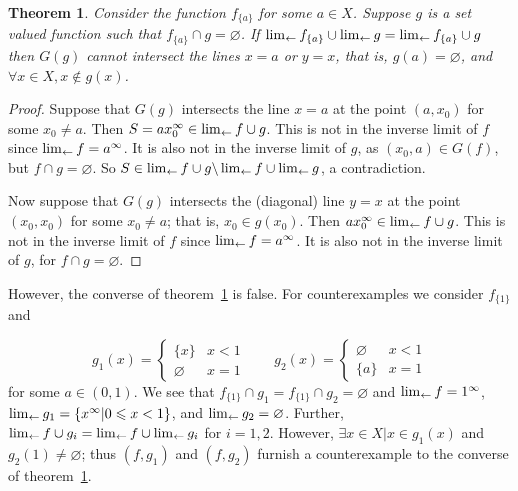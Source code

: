 \documentclass{article}
\newtheorem{thm}{Theorem}
\theoremstyle{definition}
\let\emptyset\varnothing
\begin{document}
\newcommand{\fa}{f_{\lbrace a\rbrace}}

\begin{thm}\label{fish}
Consider the function $\fa$ for some $a\in X$.  Suppose $g$ is a set
valued function such that $\fa\cap g=\emptyset$.  If
$\invlim{\fa}\cup\invlim{g} = \invlim{\fa\cup g}$ then $G(g)$ cannot
intersect the lines $x = a$ or $y = x$, that is, $g(a)=\emptyset$, and
$\forall x\in X, x\notin g(x)$.
\end{thm}

\begin{proof}
Suppose that $G(g)$ intersects the line $x = a$ at the point $(a,x_0)$
for some $x_0\neq a$.  Then $S=ax_0^\infty\in\lim_{\leftarrow} f\cup g$.  This
is not in the inverse limit of $f$ since $\lim_{\leftarrow} f = a^\infty$.  It
is also not in the inverse limit of $g$, as $(x_0,a) \in G(f)$, but
$f\cap g=\emptyset$.  So $S\in\lim_{\leftarrow} f\cup
  g\backslash\lim_{\leftarrow} f\cup\lim_{\leftarrow} g$, a contradiction.

Now suppose that $G(g)$ intersects the (diagonal) line $y = x$ at the
point $(x_0,x_0)$ for some $x_0\neq a$; that is, $x_0\in g(x_0)$.
Then $ax_0^\infty\in \lim_{\leftarrow} f\cup g$.  This is not in the inverse
limit of $f$ since $\lim_{\leftarrow} f = a^\infty$.  It is also not in the
inverse limit of $g$, for $f\cap g=\emptyset$.  
\end{proof}


However, the converse of theorem~\ref{fish} is false.  For
counterexamples we consider $f_{\lbrace 1\rbrace}$ and

\begin{equation}
  g_1(x) = \begin{cases}
    \lbrace x\rbrace & x<1\\
    \emptyset & x=1
  \end{cases}
\qquad
  g_2(x) = \begin{cases}
    \emptyset & x<1\\
    \lbrace a\rbrace & x=1
  \end{cases}
\end{equation}
for some $a\in(0,1)$.  We see that $
f_{\lbrace 1\rbrace}\cap g_{1}=
f_{\lbrace 1\rbrace}\cap g_{2}
=\emptyset$
and $\lim_{\leftarrow} f=1^\infty$,
$\lim_{\leftarrow} g_1=\lbrace x^\infty | 0\leqslant x< 1\rbrace$, and
$\invlim{g_2}=\emptyset$.  Further, $\lim_{\leftarrow} f\cup
  g_i=\lim_{\leftarrow} f\cup\lim_{\leftarrow} g_i$ for $i=1,2$.  However, $\exists
x\in X|x\in g_1(x)$ and $g_2(1)\neq\emptyset$; thus $(f,g_1)$ and
$(f,g_2)$ furnish a counterexample to the converse of
theorem~\ref{fish}.
\end{document}

